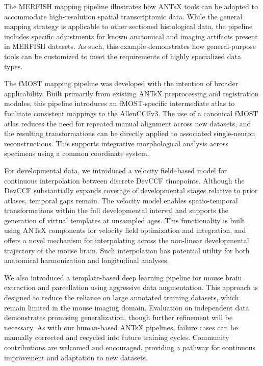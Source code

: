 \documentclass[
  12pt,
]{article}
\begin{document}
The MERFISH mapping pipeline illustrates how ANTsX tools can be adapted
to accommodate high-resolution spatial transcriptomic data. While the
general mapping strategy is applicable to other sectioned histological
data, the pipeline includes specific adjustments for known anatomical
and imaging artifacts present in MERFISH datasets. As such, this example
demonstrates how general-purpose tools can be customized to meet the
requirements of highly specialized data types.

The fMOST mapping pipeline was developed with the intention of broader
applicability. Built primarily from existing ANTsX preprocessing and
registration modules, this pipeline introduces an fMOST-specific
intermediate atlas to facilitate consistent mappings to the AllenCCFv3.
The use of a canonical fMOST atlas reduces the need for repeated manual
alignment across new datasets, and the resulting transformations can be
directly applied to associated single-neuron reconstructions. This
supports integrative morphological analysis across specimens using a
common coordinate system.

For developmental data, we introduced a velocity field--based model for
continuous interpolation between discrete DevCCF timepoints. Although
the DevCCF substantially expands coverage of developmental stages
relative to prior atlases, temporal gaps remain. The velocity model
enables spatio-temporal transformations within the full developmental
interval and supports the generation of virtual templates at unsampled
ages. This functionality is built using ANTsX components for velocity
field optimization and integration, and offers a novel mechanism for
interpolating across the non-linear developmental trajectory of the
mouse brain. Such interpolation has potential utility for both
anatomical harmonization and longitudinal analyses.

We also introduced a template-based deep learning pipeline for mouse
brain extraction and parcellation using aggressive data augmentation.
This approach is designed to reduce the reliance on large annotated
training datasets, which remain limited in the mouse imaging domain.
Evaluation on independent data demonstrates promising generalization,
though further refinement will be necessary. As with our human-based
ANTsX pipelines, failure cases can be manually corrected and recycled
into future training cycles. Community contributions are welcomed and
encouraged, providing a pathway for continuous improvement and
adaptation to new datasets.
\end{document}
